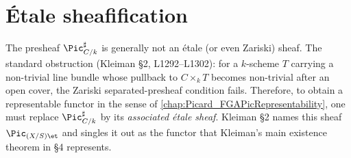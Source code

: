 \section{\'Etale sheafification}
\label{sec:relpic_etale_sheaf}

The presheaf \(\Pic^\sharp_{C/k}\) is generally not an \'etale (or even Zariski)
sheaf. The standard obstruction (Kleiman \S 2, L1292--L1302): for a \(k\)-scheme
\(T\) carrying a non-trivial line bundle whose pullback to \(C \times_k T\) becomes
non-trivial after an open cover, the Zariski separated-presheaf condition
fails. Therefore, to obtain a representable functor in the sense of
\cref{chap:Picard_FGAPicRepresentability}, one must replace
\(\Pic^\sharp_{C/k}\) by its \emph{associated \'etale sheaf}. Kleiman \S 2 names
this sheaf \(\Pic_{(X/S)\et}\) and singles it out as the functor that Kleiman's
main existence theorem in \S 4 represents.

